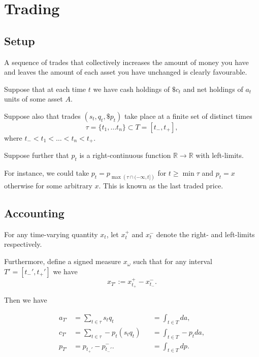 \documentclass{article}
\newcommand{\sectionquote}[1]{\def\insertsquote{#1}}
\newcommand{\insertsquote}{}
\renewcommand{\insertsquote}{}%
\begin{document}
\sectionquote{``To gain an advantage from better knowledge of facilities of communication or transport is sometimes regarded as almost dishonest, although it is quite as important that society make use of the best opportunities in this respect as in using the latest scientific discoveries.'' Hayek}
\section{Trading}
\subsection{Setup}
A sequence of trades that collectively increases the amount of money you have and leaves the amount of each asset you have unchanged is clearly favourable.

Suppose that at each time $t$ we have cash holdings of $\$c_t$ and net holdings of $a_t$ units of some asset $A$.

Suppose also that trades $(s_t, q_t, \$p_t)$ take place at a finite set of distinct times
$$\tau = \{t_1,\ldots t_n\}\subset T = [t_-, t_+],$$
where $t_-<t_1<\ldots<t_n<t_+$.

Suppose further that $p_t$ is a right-continuous function $\mathbb R\to\mathbb R$ with left-limits.

For instance, we could take $p_t = p_{\max \left(\tau\cap (-\infty,t]\right)}$ for $t\geq \min\tau$ and $p_t=x$ otherwise for some arbitrary $x$. This is known as the last traded price.

\subsection{Accounting}
For any time-varying quantity $x_t$, let $x_t^+$ and $x_t^-$ denote the right- and left-limits respectively.

Furthermore, define a signed measure $x_\omega$ such that for any interval $T'=[t_-',t_+']$ we have
$$x_{T'} := x_{t_+}^+ - x_{t_-}^-.$$

Then we have

\begin{align*}
	a_{T'}	&= \sum_{t\in \tau} s_t q_t		&&= \int_{t\in T} da,
\\	c_{T'}	&= \sum_{t\in \tau} - p_t (s_t q_t)	&&= \int_{t\in T} - p_t da,
\\	p_{T'}	&= p_{t_+'} - p_{t_-'}^-.		&&= \int_{t\in T} dp.
\end{align*}%
\end{document}
